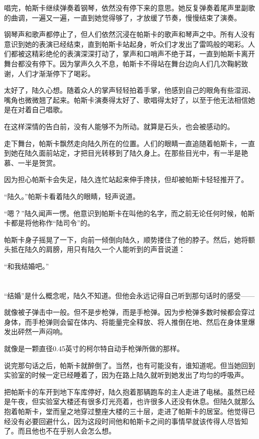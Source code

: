 唱完，帕斯卡继续弹奏着钢琴，依然没有停下来的意思。她反复弹奏着尾声里副歌的曲调，一遍又一遍，一直到她觉得够了，才放缓了节奏，慢慢结束了演奏。

钢琴声和歌声都停止了，但人们依然沉浸在帕斯卡的歌声和琴声之中。所有人没有意识到她的表演已经结束，直到帕斯卡站起身，听众们才发出了雷鸣般的喝彩。人们都被这精彩绝伦的表演深深打动了，掌声和口哨声不绝于耳，一直到帕斯卡离开舞台都没有停下。因为掌声久久不息，帕斯卡不得站在舞台边向人们几次鞠躬致谢，人们才渐渐停下了喝彩。

太好了，陆久心想。随着众人的掌声轻轻拍着手掌，他感到自己的眼角有些湿润、嘴角也微微翘了起来。帕斯卡演奏得太好了、歌唱得太好了，以至于他无法相信她是在对着自己唱歌。

在这样深情的告白前，没有人能够不为所动。就算是石头，也会被感动的。

走下舞台，帕斯卡飘然走向陆久所在的位置。人们的眼睛一直追随着帕斯卡，一直到她在陆久面前站定，才把目光转移到了陆久身上。在那些目光中，有一半是艳慕、一半是贺赏。

因为担心帕斯卡会失足，陆久连忙站起来伸手搀扶，但却被帕斯卡轻轻推开了。

“陆久。”帕斯卡看着陆久的眼睛，轻声说道。

“嗯？”陆久闻声一愣。他意识到帕斯卡在叫他的名字，而之前无论任何时候，帕斯卡都是将他称作“陆司令”的。

帕斯卡身子摇晃了一下，向前一倾倒向陆久，顺势搂住了他的脖子。然后，她将额头抵在陆久的肩膀，用只有陆久一个人能听到的声音说道：

“和我结婚吧。”

\section*{}

“结婚”是什么概念呢，陆久不知道。但他会永远记得自己听到那句话时的感受——

就像被子弹击中一般。但不是步枪弹，而是手枪弹。因为步枪弹多数时候都会穿过身体，而手枪弹则会留在体内、将能量完全释放、将人推倒在地、然后在身体里爆发出砰然一声闷响。

就像是一颗直径0.45英寸的柯尔特自动手枪弹所做的那样。

说完那句话之后，帕斯卡就醉倒了。当然，也有可能没有，谁知道呢。但当她回到实验室的时候一定已经睡着了，因为在路上陆久就听到她发出了均匀的呼吸声。

把帕斯卡的车开到地下车库停好，陆久抱着那辆跑车的主人走进了电梯。虽然已经是午夜，但实验室大楼还有很多灯光亮着，也许很多人还没有休息。但陆久就那么抱着帕斯卡，堂而皇之地穿过整座大楼的三十层，走进了帕斯卡的居室。他觉得已经没有必要回避什么，因为这段时间他和帕斯卡之间的事情早就该传得人尽皆知了。而且他也不在乎别人会怎么想。

